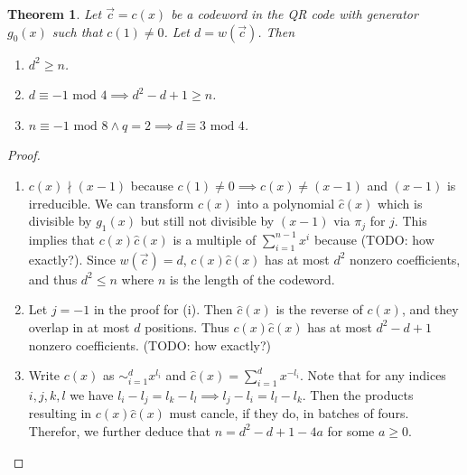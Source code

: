 \documentclass{article}
\renewcommand{\mod}{\text{ mod }}
\newcommand{\mt}{\mapsto}
\renewcommand{\=}{\equiv}
\renewcommand{\i}{^{-1}}
\renewcommand{\v}{\vec}
\theoremstyle{plain}
\newtheorem{thm}{Theorem}[subsection]
\theoremstyle{definition}
\newcommand{\TODO}[1]{(TODO: #1)}
\begin{document}
\begin{thm}
  Let $\v c = c(x)$ be a codeword in the QR code with generator $g_0(x)$ such that $c(1) \neq 0$.
  Let $d = w(\v c)$.
  Then
  \begin{enumerate}
    \item[(i)] $d^2 \geq n$.
    \item[(ii)] $d \= -1 \mod 4 \implies d^2 - d + 1 \geq n$.
    \item[(iii)] $n \= -1 \mod 8 \land q = 2 \implies d \= 3 \mod 4$.
  \end{enumerate}
\end{thm}

\begin{proof}
\hspace{0em}
\begin{enumerate}
  \item[(i)]
  $c(x) \nmid (x-1)$ because $c(1) \neq 0 \implies c(x) \neq (x-1)$ and $(x-1)$ is irreducible.
  We can transform $c(x)$ into a polynomial $\hat c(x)$ which is divisible by $g_1(x)$ but still not divisible by $(x-1)$
  via $\pi_j$ for $j$.
  This implies that $c(x) \hat c(x)$ is a multiple of $\sum_{i=1}^{n-1} x^i$ because \TODO{how exactly?}.
  Since $w(\v c) = d$, $c(x) \hat c(x)$ has at most $d^2$ nonzero coefficients, and thus $d^2 \leq n$ where $n$ is the length of the codeword.

  \item[(ii)]
  Let $j = -1$ in the proof for (i). Then $\hat c(x)$ is the reverse of $c(x)$, and they overlap in at most $d$ positions.
  Thus $c(x) \hat c(x)$ has at most $d^2 - d + 1$ nonzero coefficients. \TODO{how exactly?}

  \item[(iii)]
  Write $c(x)$ as $\sim_{i=1}^d x^{l_i}$ and $\hat c(x) = \sum_{i=1}^d x^{-l_i}$.
  Note that for any indices $i,j,k,l$ we have $l_i - l_j = l_k - l_l \implies l_j - l_i = l_l - l_k$.
  Then the products resulting in $c(x) \hat c(x)$ must cancle, if they do, in batches of fours.
  Therefor, we further deduce that $n = d^2 - d + 1 - 4a$ for some $a \geq 0$.
\end{enumerate}
\end{proof}
\end{document}
